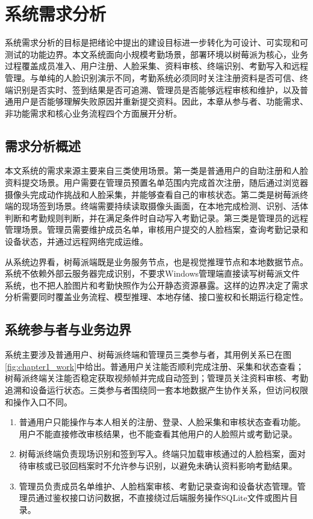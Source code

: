 \chapter{系统需求分析}

系统需求分析的目标是把绪论中提出的建设目标进一步转化为可设计、可实现和可测试的功能边界。本文系统面向小规模考勤场景，部署环境以树莓派为核心，业务过程覆盖成员准入、用户注册、人脸采集、资料审核、终端识别、考勤写入和远程管理。与单纯的人脸识别演示不同，考勤系统必须同时关注注册资料是否可信、终端识别是否实时、签到结果是否可追溯、管理员是否能够远程审核和维护，以及普通用户是否能够理解失败原因并重新提交资料。因此，本章从参与者、功能需求、非功能需求和核心业务流程四个方面展开分析。

\section{需求分析概述}

本文系统的需求来源主要来自三类使用场景。第一类是普通用户的自助注册和人脸资料提交场景。用户需要在管理员预置名单范围内完成首次注册，随后通过浏览器摄像头完成动作挑战和人脸采集，并能够查看自己的审核状态。第二类是树莓派终端的现场签到场景。终端需要持续读取摄像头画面，在本地完成检测、识别、活体判断和考勤规则判断，并在满足条件时自动写入考勤记录。第三类是管理员的远程管理场景。管理员需要维护成员名单，审核用户提交的人脸档案，查询考勤记录和设备状态，并通过远程网络完成运维。

从系统边界看，树莓派端既是业务服务节点，也是视觉推理节点和本地数据节点。系统不依赖外部云服务器完成识别，不要求Windows管理端直接读写树莓派文件系统，也不把人脸图片和考勤快照作为公开静态资源暴露。这样的边界决定了需求分析需要同时覆盖业务流程、模型推理、本地存储、接口鉴权和长期运行稳定性。

\section{系统参与者与业务边界}

系统主要涉及普通用户、树莓派终端和管理员三类参与者，其用例关系已在图\ref{fig:chapter1_work}中给出。普通用户关注能否顺利完成注册、采集和状态查看；树莓派终端关注能否稳定获取视频帧并完成自动签到；管理员关注资料审核、考勤追溯和设备运行状态。三类参与者围绕同一套本地数据产生协作关系，但访问权限和操作入口不同。

\begin{enumerate}
    \item 普通用户只能操作与本人相关的注册、登录、人脸采集和审核状态查看功能。用户不能直接修改审核结果，也不能查看其他用户的人脸照片或考勤记录。
    \item 树莓派终端负责现场识别和签到写入。终端只加载审核通过的人脸档案，面对待审核或已驳回档案时不允许参与识别，以避免未确认资料影响考勤结果。
    \item 管理员负责成员名单维护、人脸档案审核、考勤记录查询和设备状态管理。管理员通过鉴权接口访问数据，不直接绕过后端服务操作SQLite文件或图片目录。
\end{enumerate}

